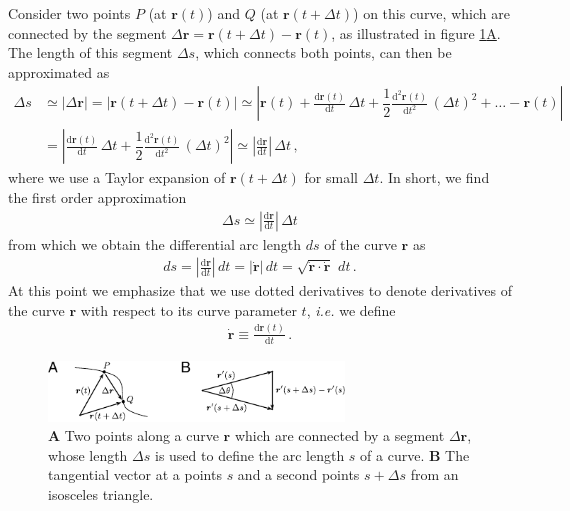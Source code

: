 \documentclass[11pt, DINA4, fleqn]{amsart}
\def\df{\mathrm{d}\xspace}
\newcommand{\dd}[2]{\frac{\df#1}{\df#2}}
\newcommand{\ddd}[2]{\frac{\df^2#1}{\df#2^2}}
\def\vr{\boldsymbol{r}\xspace}
\def\vrd{\dot{\vr}\xspace}
\begin{document}
Consider two points $P$ (at $\vr(t)$) and $Q$ (at $\vr(t+ \Delta t)$) on this curve, which are connected by the segment $\Delta\vr = \vr(t+\Delta t) - \vr(t)$, as illustrated in figure \ref{fig:figure_01}\hyperref[fig:figure_01]{A}. The length of this segment $\Delta s$, which connects both points, can then be approximated as
\begin{align}
\Delta s &\simeq |\Delta \vr| = 
\left| \vr(t + \Delta t) - \vr(t)
\right| \simeq
\left|
\vr(t) + \dd{\vr(t)}{t}\, \Delta t + \dfrac{1}{2}\ddd{\vr(t)}{t}\, (\Delta t)^2 + \dots
- \vr(t)
\right| \\
&= 
\left|
\dd{\vr(t)}{t}\, \Delta t + \dfrac{1}{2}\ddd{\vr(t)}{t}\, (\Delta t)^2
\right|
\simeq \left|\dd{\vr}{t}\right| \, \Delta t \, ,
\end{align}
where we use a Taylor expansion of $\vr(t+\Delta t)$ for small $\Delta t$. In short, we find the first order approximation
\begin{align}
\Delta s \simeq \left|\dd{\vr}{t}\right| \, \Delta t
\end{align}
from which we obtain the differential arc length $ds$ of the curve $\vr$ as
\begin{align}
ds = \left|\dd{\vr}{t}\right| \, dt
= \left|\vrd\right| \, dt = \sqrt{\vrd \cdot \vrd} \,\, dt \, .
\label{eq:diffArc}
\end{align}
At this point we emphasize
that we use dotted derivatives to denote derivatives of the curve $\vr$ with respect to its curve parameter $t$, \textit{i.e.} we define
\begin{align}
\vrd \equiv \dd{\vr(t)}{t} \, .
\end{align}

\begin{figure}[h]
\centering
\includegraphics[width=0.70\textwidth]{./figures/figure_01}
\caption{\textbf{A} Two points along a curve $\vr$ which are connected by a segment $\Delta\vr$, whose length $\Delta s$ is used to define the arc length $s$ of a curve. \textbf{B} The tangential vector at a points $s$ and a second points $s+\Delta s$ from an isosceles triangle.}
\label{fig:figure_01}
\end{figure}
\end{document}
